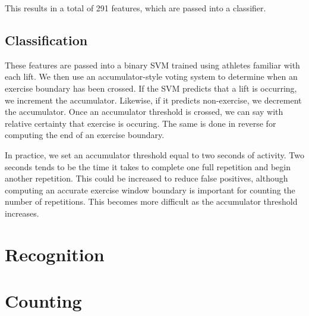 This results in a total of 291 features, which are passed into a classifier. 

\subsection{Classification}
These features are passed into a binary SVM trained using athletes familiar with each lift. We then use an accumulator-style voting system to determine when an exercise boundary has been crossed. If the SVM predicts that a lift is occurring, we increment the accumulator. Likewise, if it predicts non-exercise, we decrement the accumulator. Once an accumulator threshold is crossed, we can say with relative certainty that exercise is occuring. The same is done in reverse for computing the end of an exercise boundary.

In practice, we set an accumulator threshold equal to two seconds of activity. Two seconds tends to be the time it takes to complete one full repetition and begin another repetition. This could be increased to reduce false positives, although computing an accurate exercise window boundary is important for counting the number of repetitions. This becomes more difficult as the accumulator threshold increases.

\section{Recognition}







\section{Counting}